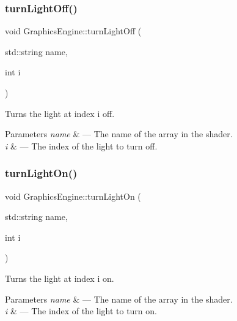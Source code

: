 \subsubsection{\texorpdfstring{turn\+Light\+Off()}{turnLightOff()}}
{\footnotesize\ttfamily void Graphics\+Engine\+::turn\+Light\+Off (\begin{DoxyParamCaption}\item[{std\+::string}]{name,  }\item[{int}]{i }\end{DoxyParamCaption})}



Turns the light at index i off. 


\begin{DoxyParams}{Parameters}
{\em name} & --- The name of the array in the shader.\\
\hline
{\em i} & --- The index of the light to turn off. \\
\hline
\end{DoxyParams}
\mbox{\label{class_graphics_engine_a72154214616a1799e1670451586c3983}} 
\subsubsection{\texorpdfstring{turn\+Light\+On()}{turnLightOn()}}
{\footnotesize\ttfamily void Graphics\+Engine\+::turn\+Light\+On (\begin{DoxyParamCaption}\item[{std\+::string}]{name,  }\item[{int}]{i }\end{DoxyParamCaption})}



Turns the light at index i on. 


\begin{DoxyParams}{Parameters}
{\em name} & --- The name of the array in the shader.\\
\hline
{\em i} & --- The index of the light to turn on. \\
\hline
\end{DoxyParams}
\mbox{\label{class_graphics_engine_adc787f919c16eda96ec6709f669ee718}} 
